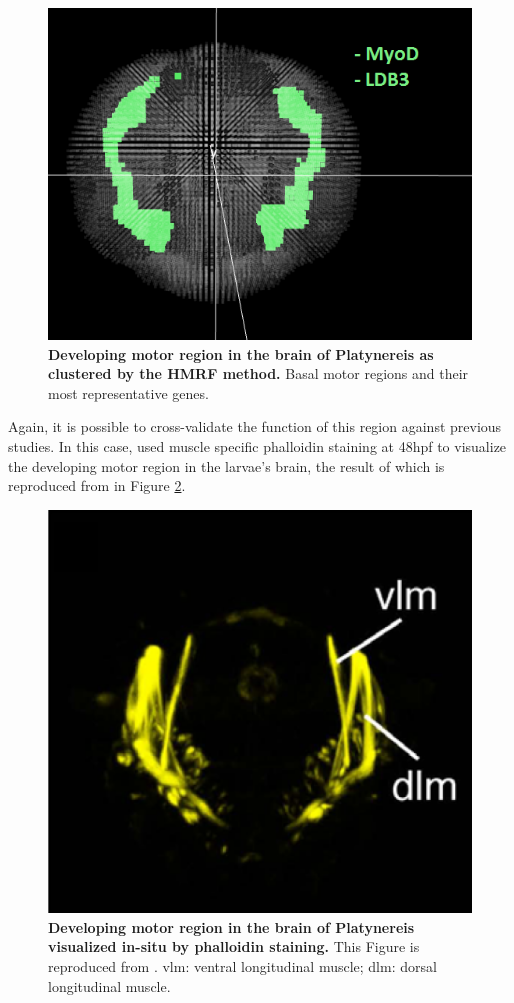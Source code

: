 	\begin{figure}[h]
\centerline{\includegraphics[width=0.8\linewidth]{gfx/chapter6/muscles.png}}
\caption{{\bf Developing motor region in the brain of Platynereis as clustered by the HMRF method.} Basal motor regions and their most representative genes.}
\label{fig:muscles}
	\end{figure}
		
		Again, it is possible to cross-validate the function of this region against previous studies. In this case, \cite{Fischer10} used muscle specific phalloidin staining at 48hpf to visualize the developing motor region in the larvae's brain, the result of which is reproduced from \cite{Fischer10} in Figure \ref{fig:muscles_stain}. 
		
		
	\begin{figure}[H]
\centerline{\includegraphics[width=0.6\linewidth]{gfx/chapter6/muscle_stain.png}}
\caption{{\bf Developing motor region in the brain of Platynereis visualized in-situ by phalloidin staining.} This Figure is reproduced from \cite{Fischer10}. vlm: ventral longitudinal muscle; dlm: dorsal longitudinal muscle.}
\label{fig:muscles_stain}
	\end{figure}
	

